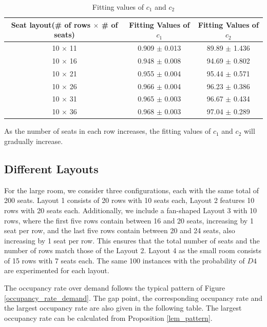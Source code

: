 \begin{table}[ht]
  \centering
  \caption{Fitting values of $c_1$ and $c_2$}
  \begin{tabular}{|c|c|c|}
  \hline
   Seat layout(\# of rows $\times$ \# of seats) & Fitting Values of $c_1$ & Fitting Values of $c_2$  \\
  \hline
   10 $\times$ 11 & 0.909 $\pm$ 0.013  & 89.89 $\pm$ 1.436 \\
   10 $\times$ 16 & 0.948 $\pm$ 0.008  & 94.69 $\pm$ 0.802 \\
   10 $\times$ 21 & 0.955 $\pm$ 0.004 & 95.44 $\pm$ 0.571 \\
   10 $\times$ 26 & 0.966 $\pm$ 0.004 & 96.23 $\pm$ 0.386 \\
   10 $\times$ 31 & 0.965 $\pm$ 0.003 & 96.67 $\pm$ 0.434 \\
   10 $\times$ 36 & 0.968 $\pm$ 0.003 & 97.04 $\pm$ 0.289 \\
   \hline
  \end{tabular}
\end{table}

As the number of seats in each row increases, the fitting values of $c_1$ and $c_2$ will gradually increase.

\subsection*{Different Layouts}
For the large room, we consider three configurations, each with the same total of 200 seats. Layout 1 consists of 20 rows with 10 seats each, Layout 2 features 10 rows with 20 seats each. Additionally, we include a fan-shaped Layout 3 with 10 rows, where the first five rows contain between 16 and 20 seats, increasing by 1 seat per row, and the last five rows contain between 20 and 24 seats, also increasing by 1 seat per row. This ensures that the total number of seats and the number of rows match those of the Layout 2. Layout 4 as the small room consists of 15 rows with 7 seats each. The same 100 instances with the probability of $D4$ are experimented for each layout.

The occupancy rate over demand follows the typical pattern of Figure \ref{occupancy_rate_demand}. The gap point, the corresponding occupancy rate and the largest occupancy rate are also given in the following table. The largest occupancy rate can be calculated from Proposition \ref{lem_pattern}.


